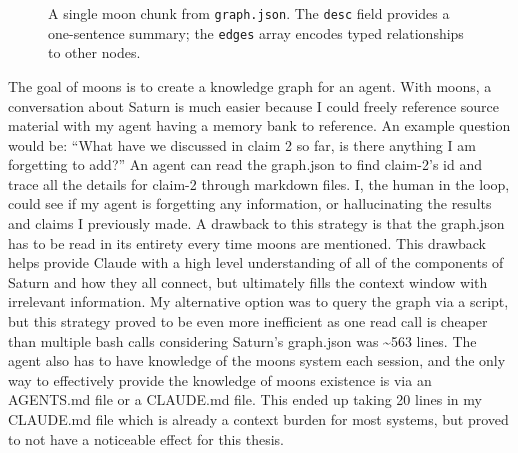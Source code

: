 \begin{figure}[ht]
\centering
{}
\caption{A single moon chunk from \texttt{graph.json}. The \texttt{desc} field provides a one-sentence summary; the \texttt{edges} array encodes typed relationships to other nodes.}
\label{fig:moon-chunk}
\end{figure}

The goal of moons is to create a knowledge graph for an agent. With moons, a conversation about Saturn is much easier because I could freely reference source material with my agent having a memory bank to reference. An example question would be: ``What have we discussed in claim 2 so far, is there anything I am forgetting to add?'' An agent can read the graph.json to find claim-2's id and trace all the details for claim-2 through markdown files. I, the human in the loop, could see if my agent is forgetting any information, or hallucinating the results and claims I previously made. A drawback to this strategy is that the graph.json has to be read in its entirety every time moons are mentioned. This drawback helps provide Claude with a high level understanding of all of the components of Saturn and how they all connect, but ultimately fills the context window with irrelevant information. My alternative option was to query the graph via a script, but this strategy proved to be even more inefficient as one read call is cheaper than multiple bash calls considering Saturn's graph.json was \textasciitilde563 lines. The agent also has to have knowledge of the moons system each session, and the only way to effectively provide the knowledge of moons existence is via an AGENTS.md file or a CLAUDE.md file. This ended up taking 20 lines in my CLAUDE.md file which is already a context burden for most systems, but proved to not have a noticeable effect for this thesis.

